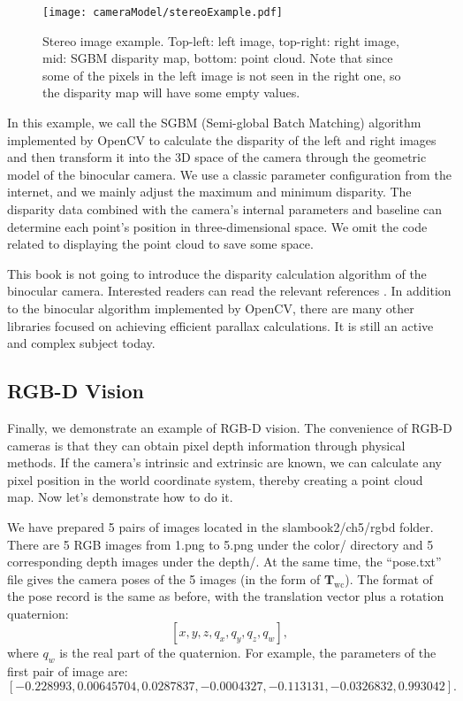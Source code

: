 \begin{figure}[!t]
    \centering
    \texttt{[image: cameraModel/stereoExample.pdf]}
    \caption{Stereo image example. Top-left: left image, top-right: right image, mid: SGBM disparity map, bottom: point cloud. Note that since some of the pixels in the left image is not seen in the right one, so the disparity map will have some empty values.}
    \label{fig:stereoExample}
\end{figure}

In this example, we call the SGBM (Semi-global Batch Matching) {\cite{Hirschmuller2008}} algorithm implemented by OpenCV to calculate the disparity of the left and right images and then transform it into the 3D space of the camera through the geometric model of the binocular camera. We use a classic parameter configuration from the internet, and we mainly adjust the maximum and minimum disparity. The disparity data combined with the camera's internal parameters and baseline can determine each point's position in three-dimensional space. We omit the code related to displaying the point cloud to save some space.

This book is not going to introduce the disparity calculation algorithm of the binocular camera. Interested readers can read the relevant references {\cite{Scharstein2002, Seitz2006}}. In addition to the binocular algorithm implemented by OpenCV, there are many other libraries focused on achieving efficient parallax calculations. It is still an active and complex subject today.

\subsection{RGB-D Vision}
\label{sec:join-point-cloud}
Finally, we demonstrate an example of RGB-D vision. The convenience of RGB-D cameras is that they can obtain pixel depth information through physical methods. If the camera's intrinsic and extrinsic are known, we can calculate any pixel position in the world coordinate system, thereby creating a point cloud map. Now let's demonstrate how to do it.

We have prepared 5 pairs of images located in the slambook2/ch5/rgbd folder. There are 5 RGB images from 1.png to 5.png under the color/ directory and 5 corresponding depth images under the depth/. At the same time, the ``pose.txt'' file gives the camera poses of the 5 images (in the form of $ \mathbf{T}_\mathrm{wc} $). The format of the pose record is the same as before, with the translation vector plus a rotation quaternion:
\[
[x, y, z, q_x, q_y, q_z, q_w],
\]
where $q_w$ is the real part of the quaternion. For example, the parameters of the first pair of image are:
\[
[-0.228993, 0.00645704, 0.0287837, -0.0004327, -0.113131, -0.0326832, 0.993042].
\]

